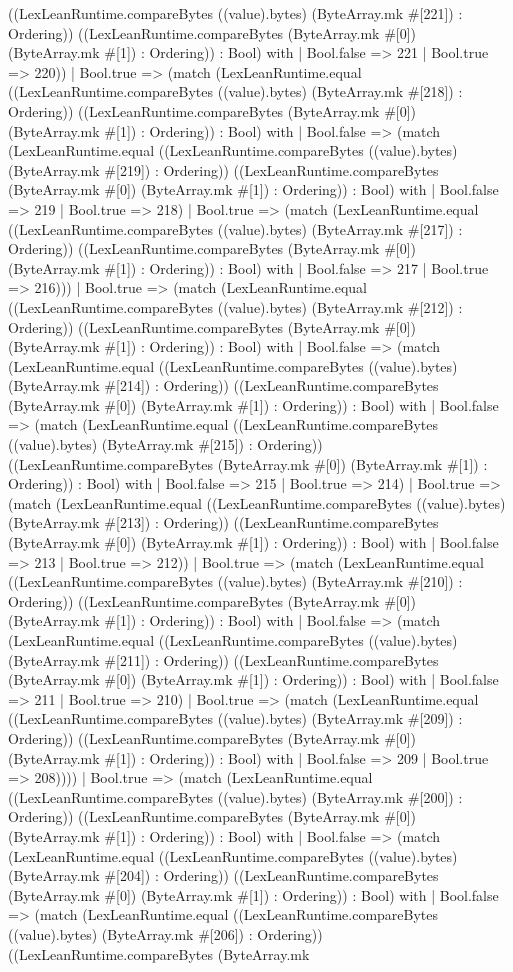 \documentclass[11pt]{article}
\begin{document}
((LexLeanRuntime.compareBytes ((value).bytes) (ByteArray.mk \#[221]) : Ordering)) ((LexLeanRuntime.compareBytes (ByteArray.mk \#[0]) (ByteArray.mk \#[1]) : Ordering)) : Bool) with | Bool.false => 221 | Bool.true => 220)) | Bool.true => (match (LexLeanRuntime.equal ((LexLeanRuntime.compareBytes ((value).bytes) (ByteArray.mk \#[218]) : Ordering)) ((LexLeanRuntime.compareBytes (ByteArray.mk \#[0]) (ByteArray.mk \#[1]) : Ordering)) : Bool) with | Bool.false => (match (LexLeanRuntime.equal ((LexLeanRuntime.compareBytes ((value).bytes) (ByteArray.mk \#[219]) : Ordering)) ((LexLeanRuntime.compareBytes (ByteArray.mk \#[0]) (ByteArray.mk \#[1]) : Ordering)) : Bool) with | Bool.false => 219 | Bool.true => 218) | Bool.true => (match (LexLeanRuntime.equal ((LexLeanRuntime.compareBytes ((value).bytes) (ByteArray.mk \#[217]) : Ordering)) ((LexLeanRuntime.compareBytes (ByteArray.mk \#[0]) (ByteArray.mk \#[1]) : Ordering)) : Bool) with | Bool.false => 217 | Bool.true => 216))) | Bool.true => (match (LexLeanRuntime.equal ((LexLeanRuntime.compareBytes ((value).bytes) (ByteArray.mk \#[212]) : Ordering)) ((LexLeanRuntime.compareBytes (ByteArray.mk \#[0]) (ByteArray.mk \#[1]) : Ordering)) : Bool) with | Bool.false => (match (LexLeanRuntime.equal ((LexLeanRuntime.compareBytes ((value).bytes) (ByteArray.mk \#[214]) : Ordering)) ((LexLeanRuntime.compareBytes (ByteArray.mk \#[0]) (ByteArray.mk \#[1]) : Ordering)) : Bool) with | Bool.false => (match (LexLeanRuntime.equal ((LexLeanRuntime.compareBytes ((value).bytes) (ByteArray.mk \#[215]) : Ordering)) ((LexLeanRuntime.compareBytes (ByteArray.mk \#[0]) (ByteArray.mk \#[1]) : Ordering)) : Bool) with | Bool.false => 215 | Bool.true => 214) | Bool.true => (match (LexLeanRuntime.equal ((LexLeanRuntime.compareBytes ((value).bytes) (ByteArray.mk \#[213]) : Ordering)) ((LexLeanRuntime.compareBytes (ByteArray.mk \#[0]) (ByteArray.mk \#[1]) : Ordering)) : Bool) with | Bool.false => 213 | Bool.true => 212)) | Bool.true => (match (LexLeanRuntime.equal ((LexLeanRuntime.compareBytes ((value).bytes) (ByteArray.mk \#[210]) : Ordering)) ((LexLeanRuntime.compareBytes (ByteArray.mk \#[0]) (ByteArray.mk \#[1]) : Ordering)) : Bool) with | Bool.false => (match (LexLeanRuntime.equal ((LexLeanRuntime.compareBytes ((value).bytes) (ByteArray.mk \#[211]) : Ordering)) ((LexLeanRuntime.compareBytes (ByteArray.mk \#[0]) (ByteArray.mk \#[1]) : Ordering)) : Bool) with | Bool.false => 211 | Bool.true => 210) | Bool.true => (match (LexLeanRuntime.equal ((LexLeanRuntime.compareBytes ((value).bytes) (ByteArray.mk \#[209]) : Ordering)) ((LexLeanRuntime.compareBytes (ByteArray.mk \#[0]) (ByteArray.mk \#[1]) : Ordering)) : Bool) with | Bool.false => 209 | Bool.true => 208)))) | Bool.true => (match (LexLeanRuntime.equal ((LexLeanRuntime.compareBytes ((value).bytes) (ByteArray.mk \#[200]) : Ordering)) ((LexLeanRuntime.compareBytes (ByteArray.mk \#[0]) (ByteArray.mk \#[1]) : Ordering)) : Bool) with | Bool.false => (match (LexLeanRuntime.equal ((LexLeanRuntime.compareBytes ((value).bytes) (ByteArray.mk \#[204]) : Ordering)) ((LexLeanRuntime.compareBytes (ByteArray.mk \#[0]) (ByteArray.mk \#[1]) : Ordering)) : Bool) with | Bool.false => (match (LexLeanRuntime.equal ((LexLeanRuntime.compareBytes ((value).bytes) (ByteArray.mk \#[206]) : Ordering)) ((LexLeanRuntime.compareBytes (ByteArray.mk 
\end{document}
